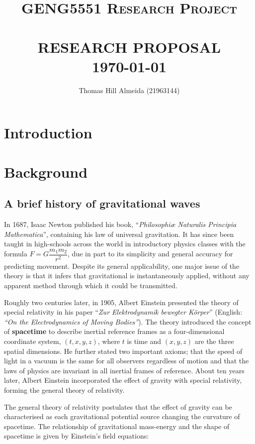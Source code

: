 \documentclass{article}
\title{\normalsize \textsc{GENG5551 Research Project}
        \\ [1.5cm]
        \HRule{0.5pt} \\
        \LARGE \textbf{\uppercase{Research Proposal}}
        \HRule{2pt} \\ [0.5cm]
        \normalsize \today \vspace*{3\baselineskip}}
\author{Thomas Hill Almeida (21963144)}
\date{}
\begin{document}
\maketitle{}
\tableofcontents{}
\newpage{}

\section*{Introduction}
\section{Background}

\subsection{A brief history of gravitational waves}

In 1687, Isaac Newton published his book, ``\textit{Philosophi\ae{} Naturalis Principia
Mathematica}'', containing his law of universal gravitation. It has since been taught in
high-schools across the world in introductory physics classes with the formula \( F =
G\dfrac{m_1m_2}{r^2} \), due in part to its simplicity and general accuracy for predicting
movement. Despite its general applicability, one major issue of the theory is that it infers that
gravitational is instantaneously applied, without any apparent method through which it could be
transmitted.

Roughly two centuries later, in 1905, Albert Einstein presented the theory of special relativity
in his paper ``\textit{Zur Elektrodynamik bewegter K{\"o}rper}'' (English: \textit{``On the
Electrodynamics of Moving Bodies''}). The theory introduced the concept of \textbf{spacetime} to
describe inertial reference frames as a four-dimensional coordinate system, \((t, x, y, z)\), where
$t$ is time and $(x, y, z)$ are the three spatial dimensions. He further stated two important
axioms; that the speed of light in a vacuum is the same for all observers regardless of motion and
that the laws of physics are invariant in all inertial frames of reference. About ten years later,
Albert Einstein incorporated the effect of gravity with special relativity, forming the general
theory of relativity.

The general theory of relativity postulates that the effect of gravity can be characterised as each
gravitational potential source changing the curvature of spacetime. The relationship of
gravitational mass-energy and the shape of spacetime is given by Einstein's field equations:
\end{document}
